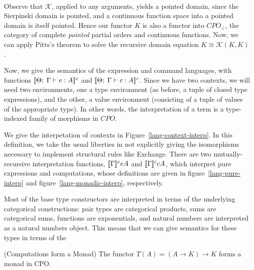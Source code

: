 \ \\\noindent 
Observe that $\mathcal{K}$, applied to any arguments, yields a pointed
domain, since the Sierpinski domain is pointed, and a continuous
function space into a pointed domain is itself pointed. Hence our
functor $K$ is also a functor into $CPO_\bot$, the category of
complete \emph{pointed} partial orders and continuous functions. Now,
we can apply Pitts's theorem to solve the recursive domain equation $K
\cong \mathcal{K}(K, K)$.


Now, we give the semantics of the expression and command languages,
with functions $[\![{{\Theta};\;{\Gamma} \vdash {e} : {A}}]\!]^e$ and
$[\![{{\Theta};\;{\Gamma} \vdash {c} : {A}}]\!]^c$. Since we have two contexts, we will
need two environments, one a type environment (as before, a tuple of
closed type expressions), and the other, a value environment
(consisting of a tuple of values of the appropriate type). In other
words, the interpretation of a term is a type-indexed family of
morphisms in $CPO$.

We give the interpetation of contexts in
Figure~\ref{lang-context-interp}. In this definition, we take the
usual liberties in not explicitly giving the isomorphisms necessary to
implement structural rules like Exchange. There are two
mutually-recursive interpretation functions, $[\![{\Gamma}]\!]^e{e}{A}$
and $[\![{\Gamma}]\!]^c{c}{A}$, which interpret pure expressions and
computations, whose definitions are given in
figure~\ref{lang-pure-interp} and figure~\ref{lang-monadic-interp},
respectively.

Most of the base type constructors are interpreted in terms of the
underlying categorical constructions: pair types are categorical
products, sums are categorical sums, functions are exponentials, and
natural numbers are interpreted as a natural numbers object. This
means that we can give semantics for these types in terms of the 


\begin{lemma}{(Computations form a Monad)} 
The functor $T(A) = (A \to K) \to K$ forms a monad in CPO. 
\end{lemma}

